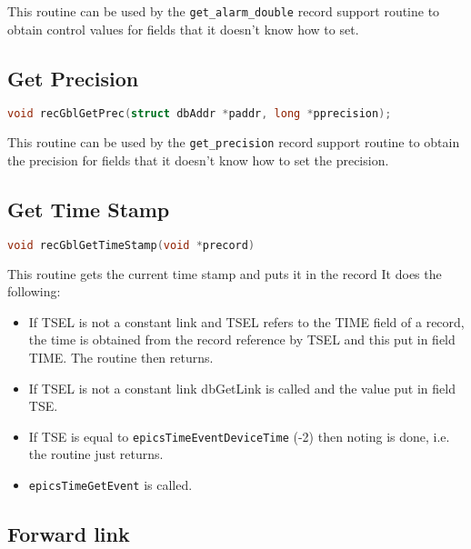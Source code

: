 This routine can be used by the \verb|get_alarm_double| record support routine to obtain control values for fields that it doesn't know how to set.

\subsection{Get Precision}

\begin{lstlisting}[language=C]
void recGblGetPrec(struct dbAddr *paddr, long *pprecision);
\end{lstlisting}

This routine can be used by the \verb|get_precision| record support routine to obtain the precision for fields that it doesn't know how to set the precision.

\subsection{Get Time Stamp}

\begin{lstlisting}[language=C]
void recGblGetTimeStamp(void *precord)
\end{lstlisting}

This routine gets the current time stamp and puts it in the record It does the following:

\begin{itemize}
\item If TSEL is not a constant link and TSEL refers to the TIME field of a record, the time is obtained from the record reference by TSEL and this put in field TIME.
The routine then returns.

\item If TSEL is not a constant link dbGetLink is called and the value put in field TSE.

\item If TSE is equal to \verb|epicsTimeEventDeviceTime| (-2) then noting is done, i.e. the routine just returns.

\item \verb|epicsTimeGetEvent| is called.

\end{itemize}

\subsection{Forward link}

